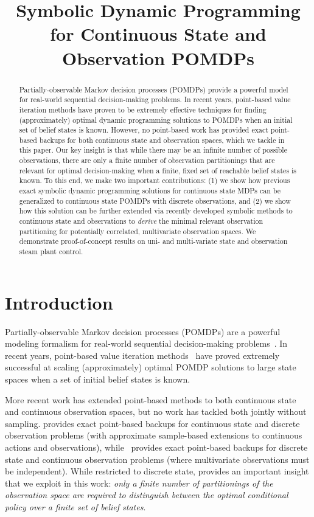 \documentclass{article} %
\title{Symbolic Dynamic Programming for Continuous State and Observation POMDPs}
\author{
}
\begin{document}
\maketitle

\begin{abstract}
Partially-observable Markov decision processes (POMDPs) provide a
powerful model for real-world sequential decision-making problems.  In
recent years, point-based value iteration methods have proven to be
extremely effective techniques for finding (approximately) optimal
dynamic programming solutions to POMDPs when an initial set of belief
states is known.  However, no point-based work has provided exact
point-based backups for both continuous state and observation spaces,
which we tackle in this paper.  Our key insight is that while there
may be an infinite number of possible observations, there are only a
finite number of observation partitionings that are relevant for
optimal decision-making when a finite, fixed set of reachable belief
states is known.  To this end, we make two important contributions:
(1) we show how previous exact symbolic dynamic programming solutions
for continuous state MDPs can be generalized to continuous state
POMDPs with discrete observations, and (2) we show how this solution
can be further extended via recently developed symbolic methods to
continuous state and observations to \emph{derive} the minimal
relevant observation partitioning for potentially correlated,
multivariate observation spaces.
We demonstrate
proof-of-concept results on uni- and multi-variate state and
observation steam plant control.
\end{abstract}

\section{Introduction} %

Partially-observable Markov decision processes (POMDPs) are a powerful
modeling formalism for real-world sequential decision-making
problems~\cite{kaebling}.  In recent years, point-based value
iteration methods~\cite{pbvi_jair06,hsvi2,Perseus} have proved
extremely successful at scaling (approximately) optimal POMDP
solutions to large state spaces when a set of initial belief states is
known.

More recent work has extended point-based methods to both continuous
state and continuous observation spaces, but no work has tackled both
jointly without sampling.  \cite{Perseus_cont} provides exact
point-based backups for continuous state and discrete observation
problems (with approximate sample-based extensions to continuous
actions and observations), while~\cite{pascal_ijcai05} provides exact
point-based backups for discrete state and continuous observation
problems (where multivariate observations must be independent).  While
restricted to discrete state, \cite{pascal_ijcai05} provides an
important insight that we exploit in this work: \emph{only a finite
number of partitionings of the observation space are required to
distinguish between the optimal conditional policy over a finite set
of belief states}.
\end{document}
